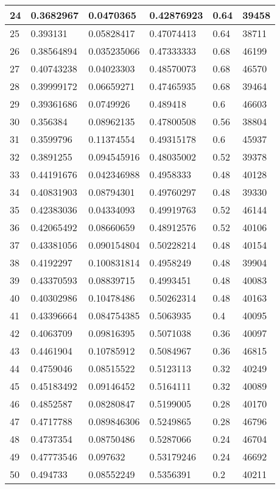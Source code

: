 \begin{longtable}{|l|l|l|l|l|l|}
24 & 0.3682967 & 0.0470365 & 0.42876923 & 0.64 & 39458 \\ \hline 
25 & 0.393131 & 0.05828417 & 0.47074413 & 0.64 & 38711 \\ \hline 
26 & 0.38564894 & 0.035235066 & 0.47333333 & 0.68 & 46199 \\ \hline 
27 & 0.40743238 & 0.04023303 & 0.48570073 & 0.68 & 46570 \\ \hline 
28 & 0.39999172 & 0.06659271 & 0.47465935 & 0.68 & 39464 \\ \hline 
29 & 0.39361686 & 0.0749926 & 0.489418 & 0.6 & 46603 \\ \hline 
30 & 0.356384 & 0.08962135 & 0.47800508 & 0.56 & 38804 \\ \hline 
31 & 0.3599796 & 0.11374554 & 0.49315178 & 0.6 & 45937 \\ \hline 
32 & 0.3891255 & 0.094545916 & 0.48035002 & 0.52 & 39378 \\ \hline 
33 & 0.44191676 & 0.042346988 & 0.4958333 & 0.48 & 40128 \\ \hline 
34 & 0.40831903 & 0.08794301 & 0.49760297 & 0.48 & 39330 \\ \hline 
35 & 0.42383036 & 0.04334093 & 0.49919763 & 0.52 & 46144 \\ \hline 
36 & 0.42065492 & 0.08660659 & 0.48912576 & 0.52 & 40106 \\ \hline 
37 & 0.43381056 & 0.090154804 & 0.50228214 & 0.48 & 40154 \\ \hline 
38 & 0.4192297 & 0.100831814 & 0.4958249 & 0.48 & 39904 \\ \hline 
39 & 0.43370593 & 0.08839715 & 0.4993451 & 0.48 & 40083 \\ \hline 
40 & 0.40302986 & 0.10478486 & 0.50262314 & 0.48 & 40163 \\ \hline 
41 & 0.43396664 & 0.084754385 & 0.5063935 & 0.4 & 40095 \\ \hline 
42 & 0.4063709 & 0.09816395 & 0.5071038 & 0.36 & 40097 \\ \hline 
43 & 0.4461904 & 0.10785912 & 0.5084967 & 0.36 & 46815 \\ \hline 
44 & 0.4759046 & 0.08515522 & 0.5123113 & 0.32 & 40249 \\ \hline 
45 & 0.45183492 & 0.09146452 & 0.5164111 & 0.32 & 40089 \\ \hline 
46 & 0.4852587 & 0.08280847 & 0.5199005 & 0.28 & 40170 \\ \hline 
47 & 0.4717788 & 0.089846306 & 0.5249865 & 0.28 & 46796 \\ \hline 
48 & 0.4737354 & 0.08750486 & 0.5287066 & 0.24 & 46704 \\ \hline 
49 & 0.47773546 & 0.097632 & 0.53179246 & 0.24 & 46692 \\ \hline 
50 & 0.494733 & 0.08552249 & 0.5356391 & 0.2 & 40211 \\ \hline 
\end{longtable}